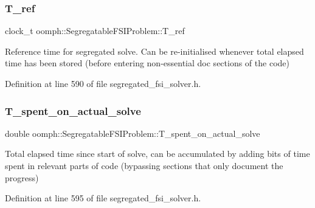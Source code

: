 \subsubsection{\texorpdfstring{T\+\_\+ref}{T\_ref}}
{\footnotesize\ttfamily clock\+\_\+t oomph\+::\+Segregatable\+F\+S\+I\+Problem\+::\+T\+\_\+ref\hspace{0.3cm}{\ttfamily [private]}}



Reference time for segregated solve. Can be re-\/initialised whenever total elapsed time has been stored (before entering non-\/essential doc sections of the code) 



Definition at line 590 of file segregated\+\_\+fsi\+\_\+solver.\+h.

\mbox{\label{classoomph_1_1SegregatableFSIProblem_a8043214c2864bd7584f40e684dcceb58}} 
\subsubsection{\texorpdfstring{T\+\_\+spent\+\_\+on\+\_\+actual\+\_\+solve}{T\_spent\_on\_actual\_solve}}
{\footnotesize\ttfamily double oomph\+::\+Segregatable\+F\+S\+I\+Problem\+::\+T\+\_\+spent\+\_\+on\+\_\+actual\+\_\+solve\hspace{0.3cm}{\ttfamily [private]}}



Total elapsed time since start of solve, can be accumulated by adding bits of time spent in relevant parts of code (bypassing sections that only document the progress) 



Definition at line 595 of file segregated\+\_\+fsi\+\_\+solver.\+h.

\mbox{\label{classoomph_1_1SegregatableFSIProblem_abb20be243e501b04b18da8697ce0985d}} 
